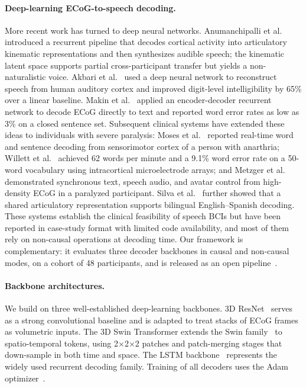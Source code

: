 \documentclass[10pt]{article}
\begin{document}
\paragraph{Deep-learning ECoG-to-speech decoding.}
More recent work has turned to deep neural networks. Anumanchipalli et al.~\cite{anumanchipalli2019speech} introduced a recurrent pipeline that decodes cortical activity into articulatory kinematic representations and then synthesizes audible speech; the kinematic latent space supports partial cross-participant transfer but yields a non-naturalistic voice. Akbari et al.~\cite{akbari2019towards} used a deep neural network to reconstruct speech from human auditory cortex and improved digit-level intelligibility by 65\% over a linear baseline. Makin et al.~\cite{makin2020machine} applied an encoder-decoder recurrent network to decode ECoG directly to text and reported word error rates as low as 3\% on a closed sentence set. Subsequent clinical systems have extended these ideas to individuals with severe paralysis: Moses et al.~\cite{moses2021neuroprosthesis} reported real-time word and sentence decoding from sensorimotor cortex of a person with anarthria; Willett et al.~\cite{willett2023highperformance} achieved 62 words per minute and a 9.1\% word error rate on a 50-word vocabulary using intracortical microelectrode arrays; and Metzger et al.~\cite{metzger2023highperformance} demonstrated synchronous text, speech audio, and avatar control from high-density ECoG in a paralyzed participant. Silva et al.~\cite{silva2024bilingual} further showed that a shared articulatory representation supports bilingual English--Spanish decoding. These systems establish the clinical feasibility of speech BCIs but have been reported in case-study format with limited code availability, and most of them rely on non-causal operations at decoding time. Our framework is complementary: it evaluates three decoder backbones in causal and non-causal modes, on a cohort of 48 participants, and is released as an open pipeline~\cite{anumanchipalli2019speech,makin2020machine,moses2021neuroprosthesis,metzger2023highperformance,silva2024bilingual}.

\paragraph{Backbone architectures.}
We build on three well-established deep-learning backbones. 3D ResNet~\cite{he2016deep} serves as a strong convolutional baseline and is adapted to treat stacks of ECoG frames as volumetric inputs. The 3D Swin Transformer extends the Swin family~\cite{liu2021swin,liu2022video} to spatio-temporal tokens, using 2$\times$2$\times$2 patches and patch-merging stages that down-sample in both time and space. The LSTM backbone~\cite{hochreiter1997lstm} represents the widely used recurrent decoding family. Training of all decoders uses the Adam optimizer~\cite{kingma2015adam}.
\end{document}
